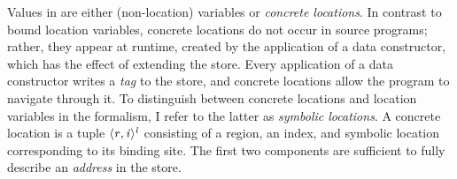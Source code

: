 Values in \ourcalc{} are either (non-location) variables or
\emph{concrete locations}.
%
In contrast to bound location variables, concrete locations
do not occur in source programs; rather, they appear at runtime, created by the
application of a data constructor, which has the effect of
extending the store.
%
Every application of a data constructor writes a \emph{tag} to the store, and
concrete locations allow the program to navigate through it.
%
To distinguish between concrete locations and location variables in
the formalism, I refer to the latter as \emph{symbolic locations}.
%
A concrete location is a tuple
$\langle \mathit{r}, \mathit{i} \rangle ^{\mathit{l}}$ consisting of a region, an index, and
symbolic location corresponding to its binding site.
%
The first two components are sufficient to fully describe
an \emph{address} in the store.

%
%

